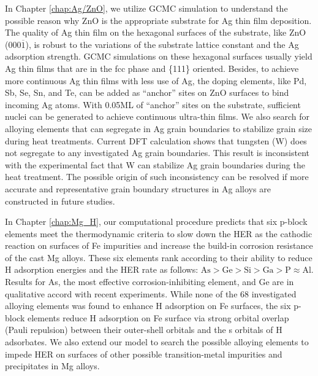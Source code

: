 In Chapter \ref{chap:Ag/ZnO}, we utilize \acf{GCMC} simulation to understand the possible reason why ZnO is the appropriate substrate for Ag thin film deposition. The quality of Ag thin film on the hexagonal surfaces of the substrate, like ZnO (000$\overline{1}$), is robust to the variations of the substrate lattice constant and the Ag adsorption strength. \ac{GCMC} simulations on these hexagonal surfaces usually yield Ag thin films that are in the fcc phase and \{111\} oriented. Besides, to achieve more continuous Ag thin films with less use of Ag, the doping elements, like Pd, Sb, Se, Sn, and Te, can be added as ``anchor'' sites on ZnO surfaces to bind incoming Ag atoms. With 0.05\ac{ML} of ``anchor'' sites on the substrate, sufficient nuclei can be generated to achieve continuous ultra-thin films. We also search for alloying elements that can segregate in Ag grain boundaries to stabilize grain size during heat treatments. Current \ac{DFT} calculation shows that tungsten (W) does not segregate to any investigated Ag grain boundaries. This result is inconsistent with the experimental fact that W can stabilize Ag grain boundaries during the heat treatment. The possible origin of such inconsistency can be resolved if more accurate and representative grain boundary structures in Ag alloys are constructed in future studies.

In Chapter \ref{chap:Mg_H}, our computational procedure predicts that six p-block elements meet the thermodynamic criteria to slow down the \acf{HER} as the cathodic reaction on surfaces of Fe impurities and increase the build-in corrosion resistance of the cast Mg alloys. These six elements rank according to their ability to reduce H adsorption energies and the \ac{HER} rate as follows: $\text{As} > \text{Ge} > \text{Si} > \text{Ga} > \text{P} \approx \text{Al}$. Results for As, the most effective corrosion-inhibiting element, and Ge are in qualitative accord with recent experiments. While none of the 68 investigated alloying elements was found to enhance H adsorption on Fe surfaces, the six p-block elements reduce H adsorption on Fe surface via strong orbital overlap (Pauli repulsion) between their outer-shell orbitals and the s orbitals of H adsorbates. We also extend our model to search the possible alloying elements to impede \ac{HER} on surfaces of other possible transition-metal impurities and precipitates in Mg alloys. 

